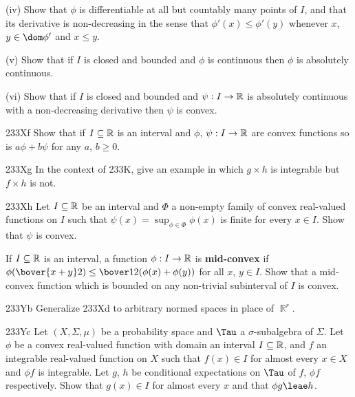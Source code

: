 {\quad (iv) Show that $\phi$ is differentiable at all but countably many
points of $I$, and that its derivative is non-decreasing in
the sense that $\phi'(x)\le\phi'(y)$ whenever $x$, $y\in\dom\phi'$ and
$x\le y$.

\quad (v) Show that if $I$ is closed and bounded and $\phi$ is
continuous then $\phi$ is absolutely continuous.

\quad (vi) Show that if $I$ is closed and bounded and $\psi:I\to\Bbb R$
is absolutely continuous with a non-decreasing derivative then
$\psi$ is convex.

\spheader 233Xf Show that if $I\subseteq\Bbb R$ is an interval and
$\phi$, $\psi:I\to\Bbb R$ are convex functions so is $a\phi+b\psi$ for
any $a$, $b\ge 0$.

\spheader 233Xg In the context of 233K, give an example in which
$g\times h$ is integrable but $f\times h$ is not.  

\spheader 233Xh Let $I\subseteq\Bbb R$ be an interval and $\Phi$ a
non-empty family of convex real-valued functions on $I$ such that
$\psi(x)=\sup_{\phi\in\Phi}\phi(x)$ is finite for every $x\in I$.   Show
that $\psi$ is convex.

 If $I\subseteq\Bbb R$ is an
interval, a function $\phi:I\to\Bbb R$ is {\bf mid-convex} if
$\phi(\bover{x+y}2)\le\bover12(\phi(x)+\phi(y))$ for all $x$, $y\in I$.
Show that a mid-convex function which is bounded on any non-trivial
subinterval of $I$ is convex.

\spheader 233Yb Generalize 233Xd to arbitrary normed spaces in
place of $\BbbR^r$.

\spheader 233Yc Let $(X,\Sigma,\mu)$ be a probability space and
$\Tau$ a $\sigma$-subalgebra of $\Sigma$.   Let $\phi$ be a convex
real-valued function with domain an interval $I\subseteq\Bbb R$, and $f$
an integrable real-valued function on $X$ such that $f(x)\in I$ for
almost every $x\in X$ and $\phi f$ is integrable.   Let $g$,
$h$ be conditional expectations on $\Tau$ of $f$, $\phi f$
respectively.   Show that $g(x)\in I$ for almost every $x$ and that
$\phi g\leae h$.

}
